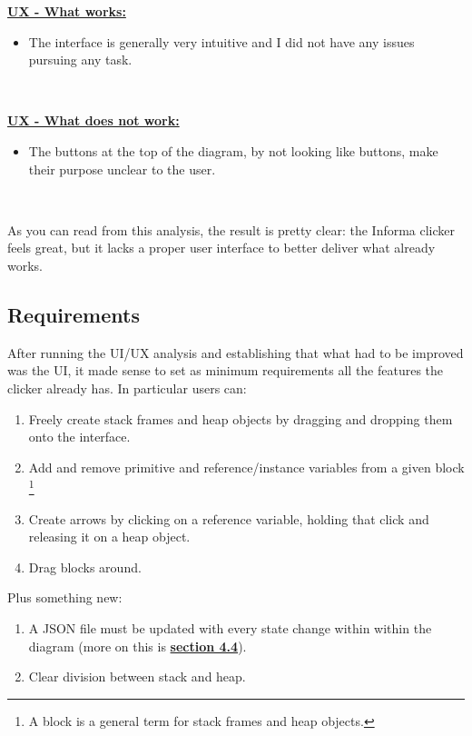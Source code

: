 \documentclass[]{usiinfbachelorproject}
\begin{document}
\textbf{\ul{UX - What works:}}

\begin{itemize}
	\item The interface is generally very intuitive and I did not have any issues pursuing any task.
\end{itemize}\

\textbf{\ul{UX - What does not work:}}

\begin{itemize}
	\item The buttons at the top of the diagram, by not looking like buttons, make their purpose unclear to the user.
\end{itemize}\

\noindent As you can read from this analysis, the result is pretty clear: the Informa clicker feels great, but it lacks a proper user interface to better deliver what already works.

\subsection{Requirements}

After running the UI/UX analysis and establishing that what had to be improved was the UI, it made sense to set as minimum requirements all the features the clicker already has. In particular users can:

\begin{enumerate}
	\item Freely create stack frames and heap objects by dragging and dropping them onto the interface.
	\item Add and remove primitive and reference/instance variables from a given block \footnote{A block is a general term for stack frames and heap objects.}
	\item Create arrows by clicking on a reference variable, holding that click and releasing it on a heap object.
	\item Drag blocks around.
\end{enumerate}

\noindent Plus something new:

\begin{enumerate}
	\item A JSON file must be updated with every state change within within the diagram (more on this is \hyperref[storing states]{\textbf{section 4.4}}).
	\item Clear division between stack and heap.
\end{enumerate}
\end{document}
